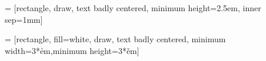 % 


 = [rectangle, draw, text badly centered, minimum height=2.5em, inner sep=1mm]

 =
[rectangle, fill=white, draw, text badly centered, minimum width=3*\h em,minimum height=3*\v em]


\newcommand{\bloq}[4]{%
	\node[bloq,#3] (#2) at (#1) {\textsf{#4}};
}
\newcommand{\add}[2]{%
	\draw (4,4) circle [radius=0.3] node (add) {\textsf$+$};
}

\newcommand{\propnode}[5]{%
	\pgfmathsetmacro{\minimalwidth}{sqrt (#4*\nodebasesize)}
	\node[#3,minimum width=\minimalwidth*1cm,inner sep=\nodeinnersep*0cm,circle,draw]
	(#2) at (#1) {#5};
}


